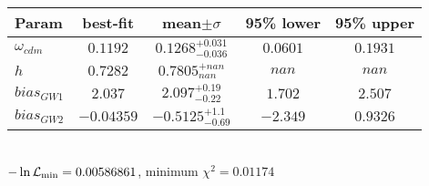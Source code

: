 \begin{tabular}{|l|c|c|c|c|} 
 \hline 
Param & best-fit & mean$\pm\sigma$ & 95\% lower & 95\% upper \\ \hline 
$\omega_{cdm }$ &$0.1192$ & $0.1268_{-0.036}^{+0.031}$ & $0.0601$ & $0.1931$ \\ 
$h$ &$0.7282$ & $0.7805_{nan}^{+nan}$ & $nan$ & $nan$ \\ 
$bias_{GW 1 }$ &$2.037$ & $2.097_{-0.22}^{+0.19}$ & $1.702$ & $2.507$ \\ 
$bias_{GW 2 }$ &$-0.04359$ & $-0.5125_{-0.69}^{+1.1}$ & $-2.349$ & $0.9326$ \\ 
\hline 
 \end{tabular} \\ 
$-\ln{\cal L}_\mathrm{min} =0.00586861$, minimum $\chi^2=0.01174$ \\ 
